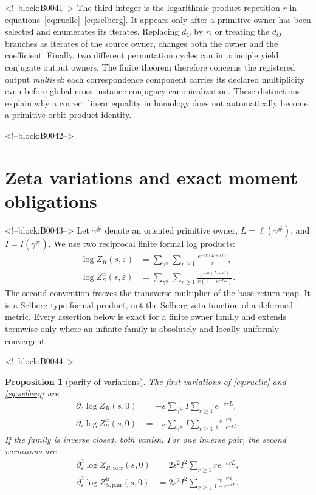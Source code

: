 \documentclass[11pt]{article}
\newtheorem{proposition}[theorem]{Proposition}
\theoremstyle{definition}
\theoremstyle{remark}
\newcommand{\e}{\varepsilon}
\begin{document}
<!--block:B0041-->
The third integer is the logarithmic-product repetition $r$ in equations~\eqref{eq:ruelle}--\eqref{eq:selberg}. It appears only after a primitive owner has been selected and enumerates its iterates. Replacing $d_O$ by $r$, or treating the $d_O$ branches as iterates of the source owner, changes both the owner and the coefficient. Finally, two different permutation cycles can in principle yield conjugate output owners. The finite theorem therefore concerns the registered output \emph{multiset}: each correspondence component carries its declared multiplicity even before global cross-instance conjugacy canonicalization. These distinctions explain why a correct linear equality in homology does not automatically become a primitive-orbit product identity.

<!--block:B0042-->
\section{Zeta variations and exact moment obligations}

<!--block:B0043-->
Let $\gamma^\#$ denote an oriented primitive owner, $L=\ell(\gamma^\#)$, and $I=I(\gamma^\#)$. We use two reciprocal finite formal log products:
\begin{align}
\log Z_R(s,\e)
&=\sum_{\gamma^\#}\sum_{r\geq1}\frac{e^{-sr(L+\e I)}}r,\label{eq:ruelle}\\
\log Z_S^{\mathrm{fr}}(s,\e)
&=\sum_{\gamma^\#}\sum_{r\geq1}
\frac{e^{-sr(L+\e I)}}{r(1-e^{-rL})}.\label{eq:selberg}
\end{align}
The second convention freezes the transverse multiplier of the base return map. It is a Selberg-type formal product, not the Selberg zeta function of a deformed metric. Every assertion below is exact for a finite owner family and extends termwise only where an infinite family is absolutely and locally uniformly convergent.

<!--block:B0044-->
\begin{proposition}[parity of variations]\label{prop:variations}
The first variations of \eqref{eq:ruelle} and \eqref{eq:selberg} are
\begin{align*}
\partial_\e\log Z_R(s,0)&=-s\sum_{\gamma^\#}I\sum_{r\geq1}e^{-srL},\\
\partial_\e\log Z_S^{\mathrm{fr}}(s,0)&=-s\sum_{\gamma^\#}I\sum_{r\geq1}\frac{e^{-srL}}{1-e^{-rL}}.
\end{align*}
If the family is inverse closed, both vanish. For one inverse pair, the second variations are
\begin{align*}
\partial_\e^2\log Z_{R,\mathrm{pair}}(s,0)
&=2s^2I^2\sum_{r\geq1}r e^{-srL},\\
\partial_\e^2\log Z_{S,\mathrm{pair}}^{\mathrm{fr}}(s,0)
&=2s^2I^2\sum_{r\geq1}\frac{r e^{-srL}}{1-e^{-rL}}.
\end{align*}
\end{proposition}
\end{document}
